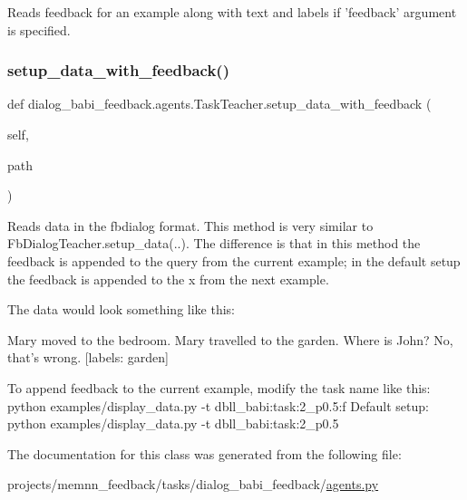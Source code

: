 \begin{DoxyVerb}Reads feedback for an example along with text and labels if 'feedback' argument
is specified.
\end{DoxyVerb}
 \mbox{\label{classdialog__babi__feedback_1_1agents_1_1TaskTeacher_a13fe8b4ae98a4a170b4885c40b611415}} 
\subsubsection{\texorpdfstring{setup\+\_\+data\+\_\+with\+\_\+feedback()}{setup\_data\_with\_feedback()}}
{\footnotesize\ttfamily def dialog\+\_\+babi\+\_\+feedback.\+agents.\+Task\+Teacher.\+setup\+\_\+data\+\_\+with\+\_\+feedback (\begin{DoxyParamCaption}\item[{}]{self,  }\item[{}]{path }\end{DoxyParamCaption})}

\begin{DoxyVerb}Reads data in the fbdialog format. This method is very similar to
FbDialogTeacher.setup_data(..). The difference is that in this method the
feedback is appended to the query from the current example; in the default setup
the feedback is appended to the x from the next example.

The data would look something like this:

Mary moved to the bedroom.
Mary travelled to the garden.
Where is John?
No, that's wrong.
[labels: garden]

To append feedback to the current example, modify the task name like this:
  python examples/display_data.py -t dbll_babi:task:2_p0.5:f
Default setup:
  python examples/display_data.py -t dbll_babi:task:2_p0.5
\end{DoxyVerb}
 

The documentation for this class was generated from the following file\+:\begin{DoxyCompactItemize}
\item 
projects/memnn\+\_\+feedback/tasks/dialog\+\_\+babi\+\_\+feedback/\hyperlink{projects_2memnn__feedback_2tasks_2dialog__babi__feedback_2agents_8py}{agents.\+py}\end{DoxyCompactItemize}
